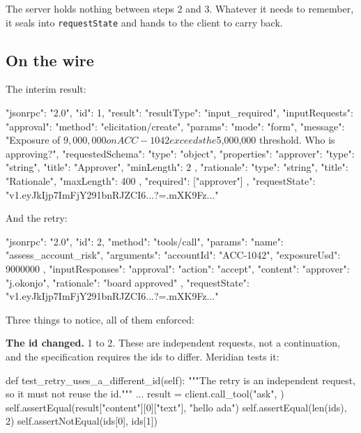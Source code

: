 The server holds nothing between steps 2 and 3. Whatever it needs to remember,
it seals into \texttt{requestState} and hands to the client to carry back.

\subsection{On the wire}

The interim result:

\begin{wire}
{
  "jsonrpc": "2.0",
  "id": 1,
  "result": {
    "resultType": "input_required",
    "inputRequests": {
      "approval": {
        "method": "elicitation/create",
        "params": {
          "mode": "form",
          "message": "Exposure of $9,000,000 on ACC-1042 exceeds the
                      $5,000,000 threshold. Who is approving?",
          "requestedSchema": {
            "type": "object",
            "properties": {
              "approver": { "type": "string", "title": "Approver",
                            "minLength": 2 },
              "rationale": { "type": "string", "title": "Rationale",
                             "maxLength": 400 }
            },
            "required": ["approver"]
          }
        }
      }
    },
    "requestState": "v1.eyJkIjp7ImFjY291bnRJZCI6...?=.mXK9Fz..."
  }
}
\end{wire}

And the retry:

\begin{wire}
{
  "jsonrpc": "2.0",
  "id": 2,
  "method": "tools/call",
  "params": {
    "name": "assess_account_risk",
    "arguments": { "accountId": "ACC-1042", "exposureUsd": 9000000 },
    "inputResponses": {
      "approval": {
        "action": "accept",
        "content": { "approver": "j.okonjo", "rationale": "board approved" }
      }
    },
    "requestState": "v1.eyJkIjp7ImFjY291bnRJZCI6...?=.mXK9Fz..."
  }
}
\end{wire}

Three things to notice, all of them enforced:

\textbf{The id changed.} 1 to 2. These are independent requests, not a
continuation, and the specification requires the ids to differ. Meridian tests
it:

\begin{py}
def test_retry_uses_a_different_id(self):
    """The retry is an independent request, so it must not reuse the id."""
    ...
    result = client.call_tool("ask", {})
    self.assertEqual(result["content"][0]["text"], "hello ada")
    self.assertEqual(len(ids), 2)
    self.assertNotEqual(ids[0], ids[1])
\end{py}

